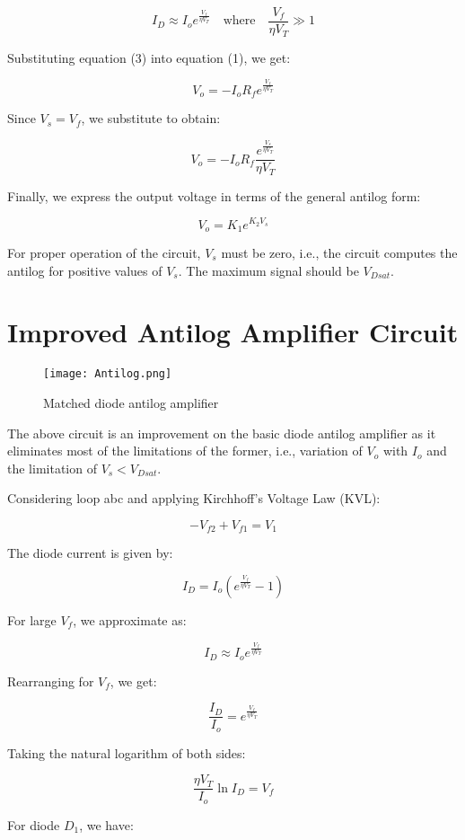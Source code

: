 \documentclass[a4paper,9pt,twoside,openany,twocolumn]{memoir}
\begin{document}
\[
I_D \approx I_o e^{\frac{V_f}{\eta V_T}} \quad \text{where} \quad \frac{V_f}{\eta V_T} \gg 1 \tag{3}
\]

Substituting equation (3) into equation (1), we get:

\[
V_o = - I_o R_f e^{\frac{V_f}{\eta V_T}}
\]

Since \( V_s = V_f \), we substitute to obtain:

\[
V_o = - I_o R_f \frac{e^{\frac{V_s}{\eta V_T}}}{\eta V_T}
\]

Finally, we express the output voltage in terms of the general antilog form:

\[
V_o = K_1 e^{K_2 V_s}
\]

For proper operation of the circuit, \( V_s \) must be zero, i.e., the circuit computes the antilog for positive values of \( V_s \). The maximum signal should be \( V_{Dsat} \).

\section*{Improved Antilog Amplifier Circuit}
\begin{figure}[H]
    \centering
    \texttt{[image: Antilog.png]}
    \caption{Matched diode antilog amplifier}
    \label{fig:question_image}
\end{figure}
The above circuit is an improvement on the basic diode antilog amplifier as it eliminates most of the limitations of the former, i.e., variation of \( V_o \) with \( I_o \) and the limitation of \( V_s < V_{Dsat} \).

Considering loop abc and applying Kirchhoff's Voltage Law (KVL):

\[
- V_{f2} + V_{f1} = V_1 \tag{1}
\]

The diode current is given by:

\[
I_D = I_o \left( e^{\frac{V_f}{\eta V_T}} - 1 \right) \tag{2}
\]

For large \( V_f \), we approximate as:

\[
I_D \approx I_o e^{\frac{V_f}{\eta V_T}} \tag{3}
\]

Rearranging for \( V_f \), we get:

\[
\frac{I_D}{I_o} = e^{\frac{V_f}{\eta V_T}} \tag{4}
\]

Taking the natural logarithm of both sides:

\[
\frac{\eta V_T}{I_o} \ln I_D = V_f \tag{5}
\]

For diode \( D_1 \), we have:
\end{document}
